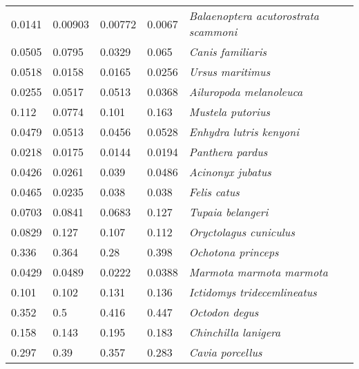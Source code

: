 \begin{tabular}{lllll}
         0.0141 &         0.00903 &         0.00772 &         0.0067 &  \textit{Balaenoptera acutorostrata scammoni} \\
         0.0505 &          0.0795 &          0.0329 &          0.065 &                     \textit{Canis familiaris} \\
         0.0518 &          0.0158 &          0.0165 &         0.0256 &                      \textit{Ursus maritimus} \\
         0.0255 &          0.0517 &          0.0513 &         0.0368 &               \textit{Ailuropoda melanoleuca} \\
          0.112 &          0.0774 &           0.101 &          0.163 &                     \textit{Mustela putorius} \\
         0.0479 &          0.0513 &          0.0456 &         0.0528 &               \textit{Enhydra lutris kenyoni} \\
         0.0218 &          0.0175 &          0.0144 &         0.0194 &                      \textit{Panthera pardus} \\
         0.0426 &          0.0261 &           0.039 &         0.0486 &                     \textit{Acinonyx jubatus} \\
         0.0465 &          0.0235 &           0.038 &          0.038 &                          \textit{Felis catus} \\
         0.0703 &          0.0841 &          0.0683 &          0.127 &                     \textit{Tupaia belangeri} \\
         0.0829 &           0.127 &           0.107 &          0.112 &                \textit{Oryctolagus cuniculus} \\
          0.336 &           0.364 &            0.28 &          0.398 &                    \textit{Ochotona princeps} \\
         0.0429 &          0.0489 &          0.0222 &         0.0388 &              \textit{Marmota marmota marmota} \\
          0.101 &           0.102 &           0.131 &          0.136 &           \textit{Ictidomys tridecemlineatus} \\
          0.352 &             0.5 &           0.416 &          0.447 &                        \textit{Octodon degus} \\
          0.158 &           0.143 &           0.195 &          0.183 &                  \textit{Chinchilla lanigera} \\
          0.297 &            0.39 &           0.357 &          0.283 &                      \textit{Cavia porcellus} \\

\end{tabular}
